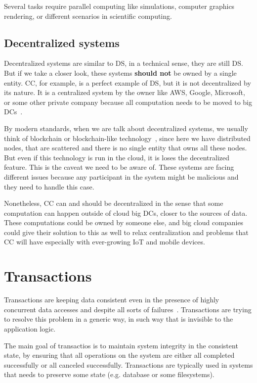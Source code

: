 Several tasks require parallel computing like simulations, computer graphics rendering, or different scenarios in scientific computing.
%
%
\subsection{Decentralized systems}\label{sec:decentralized_systems}
%
Decentralized systems are similar to DS, in a technical sense, they are still DS. But if we take a closer look, these systems \textbf{should not} be owned by a single entity. CC, for example, is a perfect example of DS, but it is not decentralized by its nature. It is a centralized system by the owner like AWS, Google, Microsoft, or some other private company because all computation needs to be moved to big DCs~\cite{HossainRH18}.

By modern standards, when we are talk about decentralized systems, we usually think of blockchain or blockchain-like technology~\cite{LeibleSSG19}, since here we have distributed nodes, that are scattered and there is no single entity that owns all these nodes. But even if this technology is run in the cloud, it is loses the decentralized feature. This is the caveat we need to be aware of. These systems are facing different issues because any participant in the system might be malicious and they need to handle this case. 

Nonetheless, CC can and should be decentralized in the sense that some computation can happen outside of cloud big DCs, closer to the sources of data. These computations could be owned by someone else, and big cloud companies could give their solution to this as well to relax centralization and problems that CC will have especially with ever-growing IoT and mobile devices.
%
%
\section{Transactions}\label{sec:transactions}
%
Transactions are keeping data consistent even in the presence of highly concurrent data accesses and despite all sorts of failures~\cite{WeikumV2002}. Transactions are trying to resolve this problem in a generic way, in such way that is invisible to the application logic.

The main goal of transactios is to maintain system integrity in the consistent state, by ensuring that all operations on the system are either all completed successfully or all canceled successfully. Transactions are typically used in systems that needs to preserve some state (e.g. database or some filesystems). 

